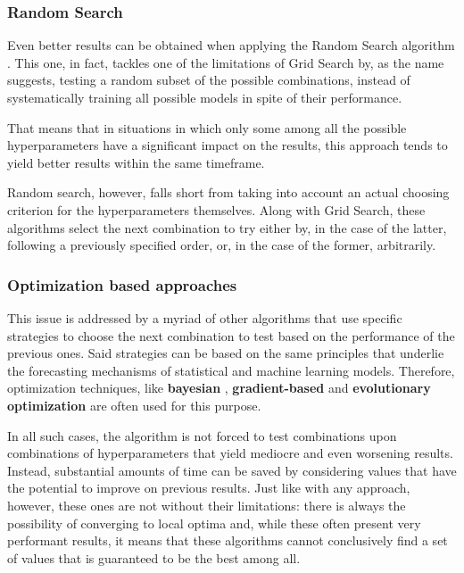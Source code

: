 \subsubsection{Random Search} \label{randoms}
Even better results can be obtained when applying the Random Search algorithm \autocite{JMLR:v13:bergstra12a}. This one, in fact, tackles one of the limitations of Grid Search by, as the name suggests, testing a random subset of the possible combinations, instead of systematically training all possible models in spite of their performance.

That means that in situations in which only some among all the possible hyperparameters have a significant impact on the results, this approach tends to yield better results within the same timeframe.

Random search, however, falls short from taking into account an actual choosing criterion for the hyperparameters themselves. Along with Grid Search, these algorithms select the next combination to try either by, in the case of the latter, following a previously specified order, or, in the case of the former, arbitrarily. 

\subsubsection{Optimization based approaches}
This issue is addressed by a myriad of other algorithms that use specific strategies to choose the next combination to test based on the performance of the previous ones. Said strategies can be based on the same principles that underlie the forecasting mechanisms of statistical and machine learning models. Therefore, optimization techniques, like 
\textbf{bayesian} \autocite{https://doi.org/10.48550/arxiv.1206.2944}, \textbf{gradient-based} \autocite{https://doi.org/10.48550/arxiv.1502.03492} and \textbf{evolutionary optimization} \autocite{DBLP:journals/corr/MiikkulainenLMR17} are often used for this purpose.

In all such cases, the algorithm is not forced to test combinations upon combinations of hyperparameters that yield mediocre and even worsening results. Instead, substantial amounts of time can be saved by considering values that have the potential to improve on previous results. 
Just like with any approach, however, these ones are not without their limitations: there is always the possibility of converging to local optima and, while these often present very performant results, it means that these algorithms cannot conclusively find a set of values that is guaranteed to be the best among all.

